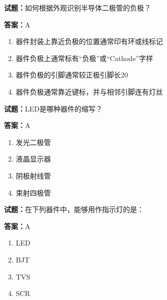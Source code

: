 \documentclass{ctexbook}
\begin{document}




\vspace{1em}

\textbf{试题：}如何根据外观识别半导体二极管的负极？ 

\textbf{答案：}A 

\begin{enumerate}[leftmargin=3em]
  \item 器件封装上靠近负极的位置通常印有环或线标记 

  \item 器件负极上通常标有“负极”或“Cathode”字样 

  \item 器件负极的引脚通常较正极引脚长20%

  \item 器件负极通常靠近键标，并与相邻引脚连有灯丝 

\end{enumerate}






\vspace{1em}

\textbf{试题：}LED是哪种器件的缩写？ 

\textbf{答案：}A 

\begin{enumerate}[leftmargin=3em]
  \item 发光二极管 

  \item 液晶显示器 

  \item 阴极射线管 

  \item 束射四极管 

\end{enumerate}





\vspace{1em}

\textbf{试题：}在下列器件中，能够用作指示灯的是： 

\textbf{答案：}A 

\begin{enumerate}[leftmargin=3em]
  \item LED 

  \item BJT 

  \item TVS 

  \item SCR 

\end{enumerate}
\end{document}
